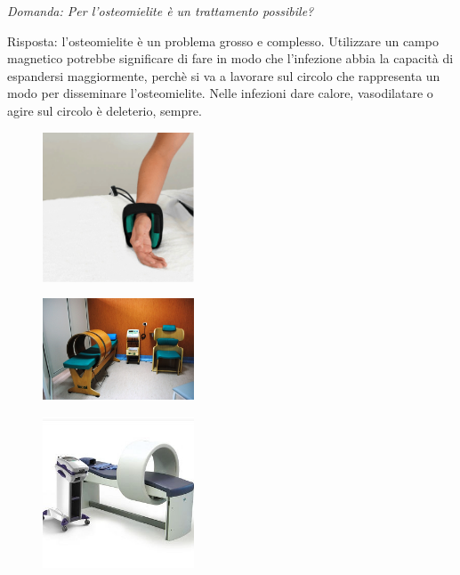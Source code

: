 \emph{Domanda: Per l'osteomielite è un trattamento possibile?}

Risposta: l'osteomielite è un problema grosso e complesso. Utilizzare un
campo magnetico potrebbe significare di fare in modo che l'infezione
abbia la capacità di espandersi maggiormente, perchè si va a lavorare
sul circolo che rappresenta un modo per disseminare l'osteomielite.
Nelle infezioni dare calore, vasodilatare o agire sul circolo è
deleterio, sempre.

\begin{figure}[!ht]
\centering
\includegraphics[width=0.4\textwidth]{026/image5.png}
\end{figure}

\begin{figure}[!ht]
\centering
\includegraphics[width=0.4\textwidth]{026/image6.jpeg}
\end{figure}

\begin{figure}[!ht]
\centering
\includegraphics[width=0.4\textwidth]{026/image7.jpeg}
\end{figure}
